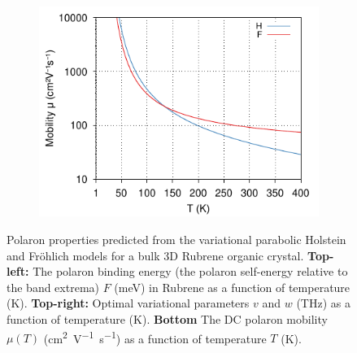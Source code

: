 \begin{figure}[!tbp]
\begin{subfigure}[b]{0.49\textwidth}
    \includegraphics[width=\textwidth]{figures/rubrene-mobility-temp-1to400K-COLOUR.pdf}
    \label{fig:rubrene_temp}
  \end{subfigure}
  \caption{Polaron properties predicted from the variational parabolic Holstein and Fr\"ohlich models for a bulk 3D Rubrene organic crystal. \textbf{Top-left:} The polaron binding energy (the polaron self-energy relative to the band extrema) $F$ (\si{meV}) in Rubrene as a function of temperature (\si{K}). \textbf{Top-right:} Optimal variational parameters $v$ and $w$ (\si{THz}) as a function of temperature (K). \textbf{Bottom} The DC polaron mobility $\mu(T)$ (\si{cm^2V^{-1}s^{-1}}) as a function of temperature $T$ (\si{K}).}
  \label{fig:rubrene_temp}
\end{figure}

